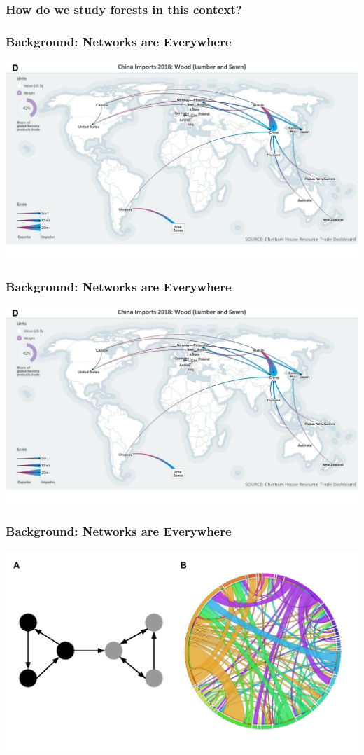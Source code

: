 \documentclass{beamer}
\begin{document}
\begin{frame}
  \frametitle{How do we study forests in this context?}


\end{frame}


\begin{frame}
  \frametitle{Background: Networks are Everywhere}


\begin{center}\includegraphics[width=0.5\linewidth]{images/resourcetrade_network} \end{center}

\end{frame}


\begin{frame}
  \frametitle{Background: Networks are Everywhere}

\begin{center}\includegraphics[width=0.5\linewidth]{images/resourcetrade_network} \end{center}


\end{frame}


\begin{frame}
  \frametitle{Background: Networks are Everywhere}

\begin{center}\includegraphics[width=0.5\linewidth]{images/example_network} \end{center}

\end{frame}
\end{document}

